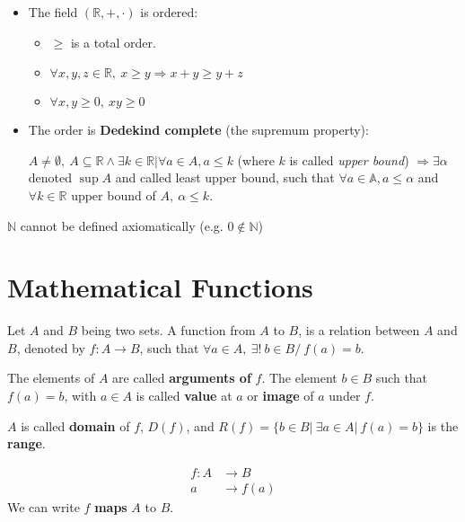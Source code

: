 \documentclass[12pt, a4paper]{book}
\begin{document}
\begin{defn}
\begin{itemize}
    \item The field $(\mathbb{R},+,\cdot)$ is ordered:
    \begin{itemize}
      \item $\geq$ is a total order.
      \item $\forall x,y,z\in\mathbb{R}, \ x\geq y \Rightarrow x+y \geq y+z$
      \item $\forall x,y \geq 0, \ xy\geq 0$
    \end{itemize}

    \item The order is \textbf{Dedekind complete} (the supremum property):
    
    $A \neq \emptyset, \ A \subseteq \mathbb{R} \wedge \exists k\in\mathbb{R} \vert \forall a\in A, a\leq k$ (where $k$ is called \textit{upper bound}) $\Rightarrow \exists \alpha$ denoted $\sup A$ and called least upper bound, such that $\forall a\in\mathbb{A}, a\leq\alpha$ and $\forall k\in\mathbb{R}$ upper bound of $A,\ \alpha \leq k$.
  \end{itemize}
\end{defn}

\begin{rem}
  $\mathbb{N}$ cannot be defined axiomatically (e.g. $0\notin\mathbb{N}$)
\end{rem}


\section{Mathematical Functions}

\begin{defn}
  \boldmath Let $A$ and $B$ being two sets. A function from $A$ to $B$, is a relation between $A$ and $B$, denoted by $f:A\rightarrow B$, such that $\forall a\in A, \ \exists!\ b\in B / \ f(a) = b$. \unboldmath

  The elements of $A$ are called \textbf{arguments of} $f$. The element $b\in B$ such that $f(a) = b$, with $a \in A$ is called \textbf{value} at $a$ or \textbf{image} of $a$ under $f$.

  $A$ is called \textbf{domain} of $f$, $D(f)$, and $R(f) = \{b\in B\vert\ \exists a\in A \vert\ f(a)=b\}$ is the \textbf{range}.
\end{defn}

\begin{notation}
  \begin{align*}
    f:A &\longrightarrow B \\
    a &\longrightarrow f(a)
  \end{align*}
  We can write \boldmath $f$ \textbf{maps} $A$ to $B$. \unboldmath
\end{notation}
\end{document}
